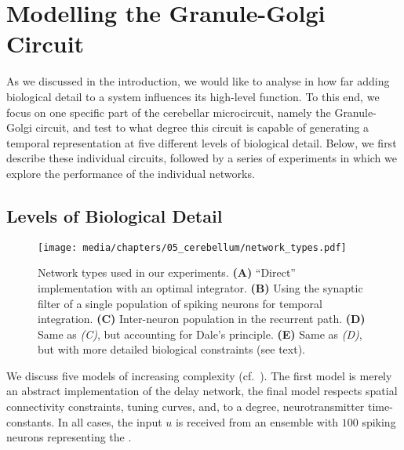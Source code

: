 
\section{Modelling the Granule-Golgi Circuit}
\label{sec:cerebellum_golgi_granule}

As we discussed in the introduction, we would like to analyse in how far adding biological detail to a system influences its high-level function.
To this end, we focus on one specific part of the cerebellar microcircuit, namely the Granule-Golgi circuit, and test to what degree this circuit is capable of generating a temporal representation at five different levels of biological detail.
Below, we first describe these individual circuits, followed by a series of experiments in which we explore the performance of the individual networks.

\subsection{Levels of Biological Detail}
\label{sec:cerebellum_levels}

\begin{figure}
	\centering
	\texttt{[image: media/chapters/05\_cerebellum/network\_types.pdf]}%
	{\label{fig:cerebellum_network_types_a}}%
	{\label{fig:cerebellum_network_types_b}}%
	{\label{fig:cerebellum_network_types_c}}%
	{\label{fig:cerebellum_network_types_d}}%
	{\label{fig:cerebellum_network_types_e}}%
	\caption[Network types used in the cerebellum experiments.]{Network types used in our experiments. \textbf{(A)} \enquote{Direct} implementation with an optimal integrator. \textbf{(B)} Using the synaptic filter of a single population of spiking neurons for temporal integration. \textbf{(C)} Inter-neuron population in the recurrent path. \textbf{(D)} Same as \emph{(C)}, but accounting for Dale's principle. \textbf{(E)} Same as \emph{(D)}, but with more detailed biological constraints (see text).}
	\label{fig:cerebellum_network_types}
\end{figure}

We discuss five models of increasing complexity (cf.~).
The first model is merely an abstract implementation of the delay network, the final model respects spatial connectivity constraints, tuning curves, and, to a degree, neurotransmitter time-constants.
In all cases, the input $u$ is received from an \NEF ensemble with $100$ spiking \LIF neurons representing the \PCN.

